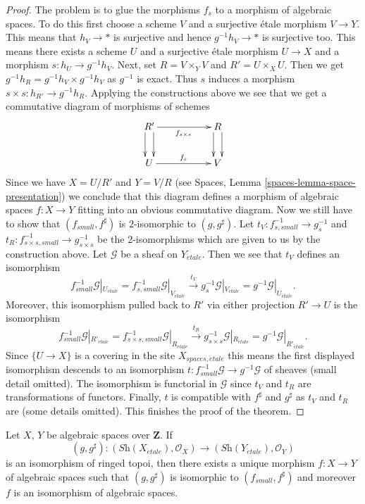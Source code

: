 \begin{proof}
\medskip\noindent
The problem is to glue the morphisms $f_s$ to a morphism of algebraic
spaces. To do this first choose a scheme $V$ and a surjective \'etale
morphism $V \to Y$. This means that $h_V \to *$ is surjective and hence
$g^{-1}h_V \to *$ is surjective too. This means there exists a scheme $U$
and a surjective \'etale morphism $U \to X$ and a morphism
$s : h_U \to g^{-1}h_V$. Next, set $R = V \times_Y V$ and
$R' = U \times_X U$. Then we get
$g^{-1}h_R = g^{-1}h_V \times g^{-1}h_V$ as $g^{-1}$ is exact.
Thus $s$ induces a morphism $s \times s : h_{R'} \to g^{-1}h_R$.
Applying the constructions above we see that we get a
commutative diagram of morphisms of schemes
$$
\xymatrix{
R' \ar@<1ex>[d] \ar@<-1ex>[d] \ar[rr]_{f_{s \times s}} & &
R \ar@<1ex>[d] \ar@<-1ex>[d] \\
U \ar[rr]^{f_s} & &
V
}
$$
Since we have $X = U/R'$ and $Y = V/R$ (see
Spaces, Lemma \ref{spaces-lemma-space-presentation})
we conclude that this diagram
defines a morphism of algebraic spaces $f : X \to Y$ fitting
into an obvious commutative diagram.
Now we still have to show that $(f_{small}, f^\sharp)$ is
$2$-isomorphic to $(g, g^\sharp)$.
Let $t_V : f_{s, small}^{-1} \to g_s^{-1}$ and
$t_R : f_{s \times s, small}^{-1} \to g_{s \times s}^{-1}$ be
the $2$-isomorphisms which are given to us by the construction above.
Let $\mathcal{G}$ be a sheaf on $Y_{\acute{e}tale}$. Then we see that
$t_V$ defines an isomorphism
$$
f_{small}^{-1}\mathcal{G}|_{U_{\acute{e}tale}}
=
f_{s, small}^{-1}\mathcal{G}|_{V_{\acute{e}tale}}
\xrightarrow{t_V}
g_s^{-1}\mathcal{G}|_{V_{\acute{e}tale}}
=
g^{-1}\mathcal{G}|_{U_{\acute{e}tale}}.
$$
Moreover, this isomorphism pulled back to $R'$ via either projection
$R' \to U$ is the isomorphism
$$
f_{small}^{-1}\mathcal{G}|_{R'_{\acute{e}tale}}
=
f_{s \times s, small}^{-1}\mathcal{G}|_{R_{\acute{e}tale}}
\xrightarrow{t_R}
g_{s \times s}^{-1}\mathcal{G}|_{R_{\acute{e}tale}}
=
g^{-1}\mathcal{G}|_{R'_{\acute{e}tale}}.
$$
Since $\{U \to X\}$ is a covering in the site $X_{spaces, \acute{e}tale}$
this means the first displayed isomorphism descends to an isomorphism
$t : f_{small}^{-1}\mathcal{G} \to g^{-1}\mathcal{G}$
of sheaves (small detail omitted). The isomorphism is functorial
in $\mathcal{G}$ since $t_V$ and $t_R$ are transformations of functors.
Finally, $t$ is compatible with $f^\sharp$ and $g^\sharp$ as
$t_V$ and $t_R$ are (some details omitted).
This finishes the proof of the theorem.
\end{proof}

\begin{lemma}
\label{lemma-isomorphism-ringed-topoi}
Let $X$, $Y$ be algebraic spaces over $\mathbf{Z}$. If
$$
(g, g^\sharp) :
(\textit{Sh}(X_{\acute{e}tale}), \mathcal{O}_X)
\longrightarrow
(\textit{Sh}(Y_{\acute{e}tale}), \mathcal{O}_Y)
$$
is an isomorphism of ringed topoi, then there exists a unique
morphism $f : X \to Y$ of algebraic spaces such that
$(g, g^\sharp)$ is isomorphic to $(f_{small}, f^\sharp)$
and moreover $f$ is an isomorphism of algebraic spaces.
\end{lemma}


